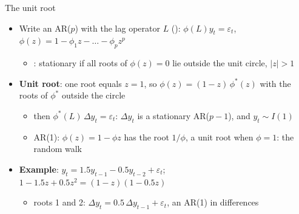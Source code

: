 \begin{frame}{The unit root}
\itemsize{\small}
\begin{itemize}
    \item Write an AR($p$) with the lag operator $L$ (): $\phi(L)y_t = \varepsilon_t$, $\phi(z) = 1 - \phi_1 z - \dots - \phi_p z^p$
    \begin{itemize}
        \item {}: stationary if all roots of $\phi(z) = 0$ lie outside the unit circle, $|z| > 1$
    \end{itemize}
    \item \textbf{Unit root}: one root equals $z = 1$, so $\phi(z) = (1 - z)\,\phi^*(z)$ with the roots of $\phi^*$ outside the circle
    \begin{itemize}
        \item then $\phi^*(L)\,\Delta y_t = \varepsilon_t$: $\Delta y_t$ is a stationary AR($p-1$), and $y_t \sim I(1)$
        \item AR(1): $\phi(z) = 1 - \phi z$ has the root $1/\phi$, a unit root when $\phi = 1$: the random walk
    \end{itemize}
    \item \textbf{Example}: $y_t = 1.5y_{t-1} - 0.5y_{t-2} + \varepsilon_t$; $1 - 1.5z + 0.5z^2 = (1 - z)(1 - 0.5z)$
    \begin{itemize}
        \item roots 1 and 2: $\Delta y_t = 0.5\,\Delta y_{t-1} + \varepsilon_t$, an AR(1) in differences
    \end{itemize}
\end{itemize}
\end{frame}

